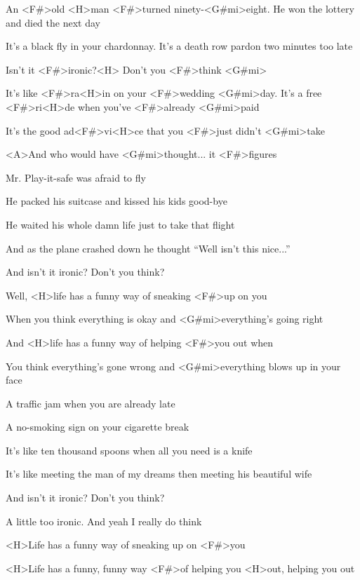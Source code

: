 

\zs
An <F#>old <H>man <F#>turned ninety-<G#mi>eight.
He won the lottery and died the next day

It's a black fly in your chardonnay.
It's a death row pardon two minutes too late

Isn't it <F#>ironic?<H> Don't you <F#>think <G#mi>
\ks

\zr
It's like <F#>ra<H>in on your <F#>wedding <G#mi>day.
It's a free <F#>ri<H>de when you've <F#>already <G#mi>paid

It's the good ad<F#>vi<H>ce that you <F#>just didn't <G#mi>take

<A>And who would have <G#mi>thought... it <F#>figures
\kr

\zs
Mr. Play-it-safe was afraid to fly

He packed his suitcase and kissed his kids good-bye

He waited his whole damn life just to take that flight

And as the plane crashed down he thought ``Well isn't this nice...''

And isn't it ironic? Don't you think?
\ks

\zr \kr

\zs
Well, <H>life has a funny way of sneaking <F#>up on you

When you think everything is okay and <G#mi>everything's going right

And <H>life has a funny way of helping <F#>you out when

You think everything's gone wrong and <G#mi>everything blows up in your face
\ks

\zs
A traffic jam when you are already late

A no-smoking sign on your cigarette break

It's like ten thousand spoons when all you need is a knife

It's like meeting the man of my dreams then meeting his beautiful wife

And isn't it ironic? Don't you think?

A little too ironic. And yeah I really do think
\ks

\zr \kr

\zs
<H>Life has a funny way of sneaking up on <F#>you

<H>Life has a funny, funny way <F#>of helping you <H>out, helping you out
\ks

\kp
